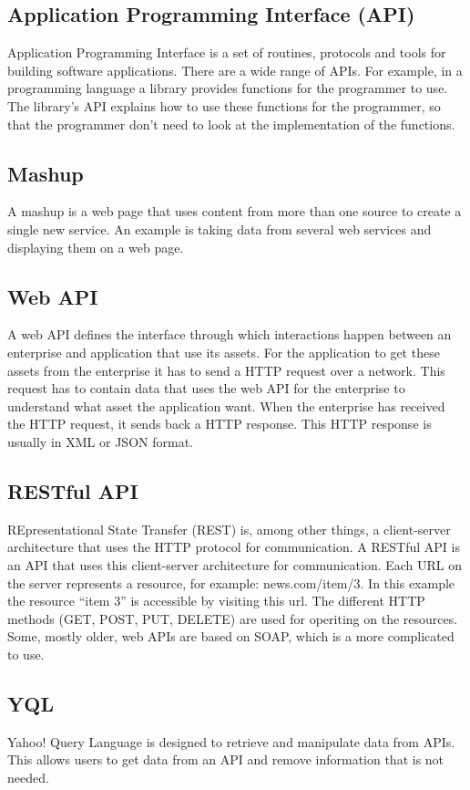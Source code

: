 \documentclass[10pt,a4paper]{article}
\begin{document}
\subsection{Application Programming Interface (API)}
Application Programming Interface is a set of routines, protocols and tools for building software applications. There are a wide range of APIs. For example, in a programming language a library provides functions for the programmer to use. The library's API explains how to use these functions for the programmer, so that the programmer don't need to look at the implementation of the functions. \cite{api}
\subsection{Mashup}
A mashup is a web page that uses content from more than one source to create a single new service. An  example is taking data from several web services and displaying them on a web page. \cite{mashup}
\subsection{Web API}
A web API defines the interface through which interactions happen between an enterprise and application that use its assets. For the application to get these assets from the enterprise it has to send a HTTP request over a network. This request has to contain data that uses the web API for the enterprise to understand what asset the application want. When the enterprise has received the HTTP request, it sends back a HTTP response. This HTTP response is usually in XML or JSON format. \cite{webapi}

\subsection{RESTful API}
\label{sec:restful-api}
REpresentational State Transfer (REST) is, among other things, a client-server architecture that uses the HTTP protocol for communication. A RESTful API is an API that uses this client-server architecture for communication. Each URL on the server represents a resource, for example: news.com/item/3. In this example the resource ``item 3'' is accessible by visiting this url. The different HTTP methods (GET, POST, PUT, DELETE) are used for operiting on the resources. Some, mostly older, web APIs are based on SOAP, which is a more complicated to use.\cite{rest}

\subsection{YQL}
Yahoo! Query Language is designed to retrieve and manipulate data from APIs. This allows users to get data from an API and remove information that is not needed. \cite{yql}
\end{document}

